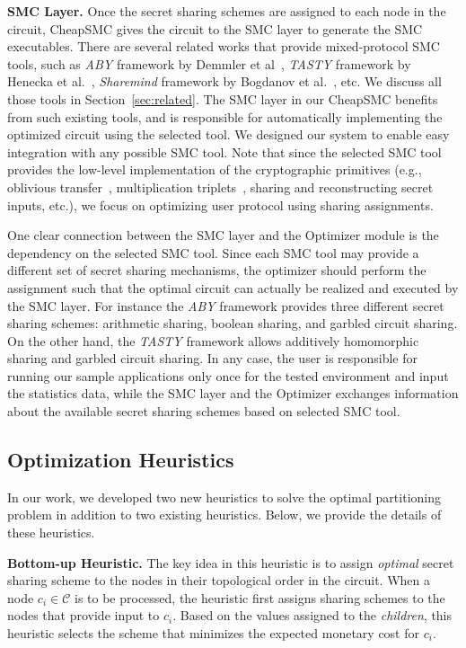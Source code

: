 \documentclass{llncs}
\newcommand{\sysname}{{CheapSMC}\xspace}
\begin{document}
\textbf{SMC Layer.} Once the secret sharing schemes are assigned to each node in the circuit, \sysname gives the circuit to the SMC layer to generate the SMC executables. There are several related works that provide mixed-protocol SMC tools, such as \emph{ABY} framework by Demmler et al~\cite{cite:demmler2015aby}, \emph{TASTY} framework by Henecka et al.~\cite{cite:henecka2010tasty}, \emph{Sharemind} framework by Bogdanov et al.~\cite{cite:bogdanov2008sharemind}, etc. We discuss all those tools in Section~\ref{sec:related}. The SMC layer in our \sysname benefits from such existing tools, and is responsible for automatically implementing the optimized circuit using the selected tool. We designed our system to enable easy integration with any possible SMC tool. Note that since the selected SMC tool provides the low-level implementation of the cryptographic primitives (e.g., oblivious transfer~\cite{cite:naor2001efficient, cite:rabin2005exchange}, multiplication triplets~\cite{cite:beaver1992efficient}, sharing and reconstructing secret inputs, etc.), we focus on optimizing user protocol using sharing assignments.

One clear connection between the SMC layer and the Optimizer module is the dependency on the selected SMC tool. Since each SMC tool may provide a different set of secret sharing mechanisms, the optimizer should perform the assignment such that the optimal circuit can actually be realized and executed by the SMC layer. For instance the \emph{ABY} framework provides three different secret sharing schemes: arithmetic sharing, boolean sharing, and garbled circuit sharing. On the other hand, the \emph{TASTY} framework allows additively homomorphic sharing and garbled circuit sharing. In any case, the user is responsible for running our sample applications only once for the tested environment and input the statistics data, while the SMC layer and the Optimizer exchanges information about the available secret sharing schemes based on selected SMC tool.

\subsection{Optimization Heuristics}
\label{sec:system:opt}
In our work, we developed two new heuristics to solve the optimal partitioning problem in addition to two existing heuristics. Below, we provide the details of these heuristics.

\textbf{Bottom-up Heuristic.} The key idea in this heuristic is to assign \emph{optimal} secret sharing scheme to the nodes in their topological order in the circuit. When a node $c_i \in \mathcal{C}$ is to be processed, the heuristic first assigns sharing schemes to the nodes that provide input to $c_i$. Based on the values assigned to the \emph{children}, this heuristic selects the scheme that minimizes the expected monetary cost for $c_i$. 
\end{document}
